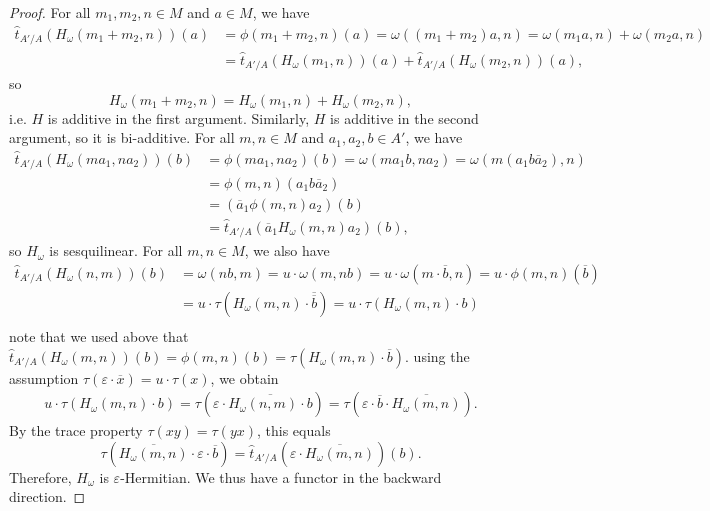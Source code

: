 \begin{proof}
    For all $m_1,m_2,n \in M$ and $a \in M$, we have 
    \begin{align*}
    \widehat{t}_{A'/A} (H_\omega(m_1+m_2,n))(a) &= \phi(m_1+m_2,n)(a) =\omega((m_1+m_2)a, n) = \omega(m_1a, n) + \omega(m_2 a, n) \\
    &= \widehat{t}_{A'/A} (H_\omega(m_1, n)) (a) + \widehat{t}_{A'/A} (H_\omega(m_2, n)) (a), 
    \end{align*}
    so 
    $$H_\omega(m_1+m_2,n) = H_\omega(m_1, n) + H_\omega(m_2, n),$$
    i.e. $H$ is additive in the first argument. Similarly, $H$ is additive in the second argument, so it is bi-additive. For all $m,n \in M$ and $a_1,a_2,b \in A'$, we have 
    \begin{align*}
        \widehat{t}_{A'/A}(H_\omega(m a_1, n a_2))(b)  &= \phi(m a_1, na_2)(b) = \omega(ma_1 b, na_2) = \omega(m (a_1 b \overline{a}_2), n) \\
        &= \phi(m,n)(a_1 b \overline{a}_2) \\
        &= (\overline{a}_1 \phi(m,n)a_2)(b) \\
        &= \widehat{t}_{A'/A}(\overline{a}_1 H_\omega(m, n) a_2)(b),
    \end{align*}
    so $H_\omega$ is sesquilinear. For all $m,n \in M$, we also have 
    \begin{align*}
    \widehat{t}_{A'/A} (H_\omega(n,m))(b) &= \omega(nb,m) = u \cdot \omega(m,nb) = u \cdot \omega(m \cdot \overline{b}, n) = u \cdot \phi(m,n)(\overline{b}) \\
    &= u \cdot \tau(H_\omega(m,n) \cdot \overline{\overline{b}}) = u \cdot \tau(H_\omega(m,n) \cdot b) \\
    \end{align*}
    note that we used above that $\widehat{t}_{A'/A}(H_\omega(m,n))(b) = \phi(m,n)(b) = \tau(H_\omega(m,n) \cdot \overline{b})$. using the assumption $\tau(\varepsilon \cdot \overline{x}) = u \cdot \tau(x)$, we obtain
    \begin{align*}
    u \cdot \tau(H_\omega(m,n) \cdot b) = \tau(\varepsilon \cdot \overline{H_\omega(n,m) \cdot b}) = \tau(\varepsilon \cdot \overline{b} \cdot \overline{H_\omega(m,n)}). 
    \end{align*}
    By the trace property $\tau(xy) = \tau(yx)$, this equals 
    $$\tau(\overline{H_\omega(m,n)} \cdot \varepsilon \cdot \overline{b}) = \widehat{t}_{A'/A}(\varepsilon \cdot \overline{H_\omega(m,n)})(b).$$
    Therefore, $H_\omega$ is $\varepsilon$-Hermitian. We thus have a functor in the backward direction.


\end{proof}
